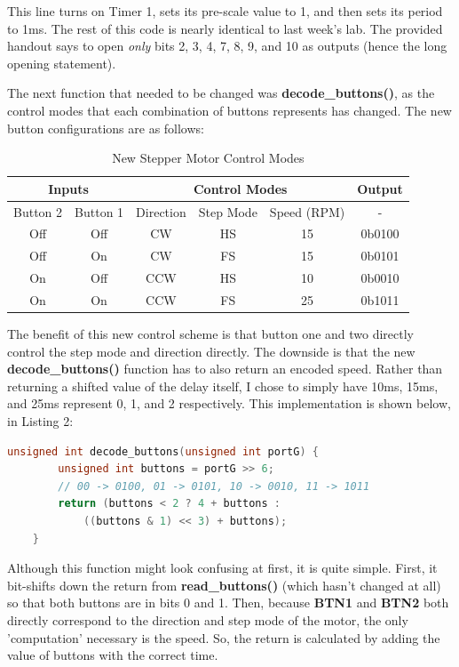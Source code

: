 \documentclass[a4paper, 12pt]{article}
\begin{document}
This line turns on Timer 1, sets its pre-scale value to 1, and then sets its period to 1ms. The rest of this code is nearly identical to last week's lab. The provided handout says to open \textit{only} bits 2, 3, 4, 7, 8, 9, and 10 as outputs (hence the long opening statement).

The next function that needed to be changed was \textbf{decode\_buttons()}, as the control modes that each combination of buttons represents has changed. The new button configurations are as follows:

\begin{table}[ht]
\centering
\begin{tabular}{cc|ccc|c}
\multicolumn{2}{c}{\textbf{Inputs}} & \multicolumn{3}{c}{\textbf{Control Modes}} & \textbf{Output}\\
\hline
Button 2 & Button 1 & Direction & Step Mode & Speed (RPM) & - \\
\hline
Off & Off & CW & HS & 15 & 0b0100 \\
Off & On & CW & FS & 15 & 0b0101 \\
On & Off & CCW & HS & 10 & 0b0010 \\
On & On & CCW & FS & 25 & 0b1011 \\
\end{tabular}
\caption{New Stepper Motor Control Modes}
\end{table}

The benefit of this new control scheme is that button one and two directly control the step mode and direction directly. The downside is that the new \textbf{decode\_buttons()} function has to also return an encoded speed. Rather than returning a shifted value of the delay itself, I chose to simply have 10ms, 15ms, and 25ms represent  0, 1, and 2 respectively. This implementation is shown below, in Listing 2:

	\begin{mdframed}[backgroundcolor=code-gray, roundcorner=10pt,
								innerleftmargin=5, innertopmargin=5, innerbottommargin=5]	
	\begin{lstlisting}[language=C, caption=Button Decoding, tabsize=2]
	unsigned int decode_buttons(unsigned int portG) {
		unsigned int buttons = portG >> 6;
		// 00 -> 0100, 01 -> 0101, 10 -> 0010, 11 -> 1011
		return (buttons < 2 ? 4 + buttons :
			((buttons & 1) << 3) + buttons);
	}
	\end{lstlisting}
	\end{mdframed}
	
Although this function might look confusing at first, it is quite simple. First, it bit-shifts down the return from \textbf{read\_buttons()} (which hasn't changed at all) so that both buttons are in bits 0 and 1. Then, because \textbf{BTN1} and \textbf{BTN2} both directly correspond to the direction and step mode of the motor, the only 'computation' necessary is the speed. So, the return is calculated by adding the value of buttons with the correct time.
\end{document}
